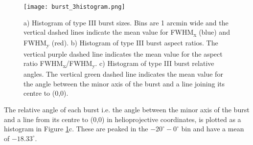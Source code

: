 \begin{figure}[ht]
\centering
\texttt{[image: burst\_3histogram.png]}
\caption[Histograms of type III burst sizes, aspect ratios and relative angles.]{a) Histogram of type III burst sizes. Bins are 1 arcmin wide and the vertical dashed lines indicate the mean value for FWHM\textsubscript{x} (blue) and FWHM\textsubscript{y} (red). b) Histogram of type III burst aspect ratios. The vertical purple dashed line indicates the mean value for the aspect ratio FWHM\textsubscript{x}/FWHM\textsubscript{y}. c) Histogram of type III burst relative angles. The vertical green dashed line indicates the mean value for the angle between the minor axis of the burst and a line joining its centre to (0,0).}
\label{fig:burst_hist}
\end{figure}


The relative angle of each burst i.e. the angle between the minor axis of the burst and a line from its centre to (0,0) in helioprojective coordinates, is plotted as a histogram in Figure \ref{fig:burst_hist}c. These are peaked in the $-20^\circ - 0^\circ$ bin and have a mean of $-18.33^\circ$.


